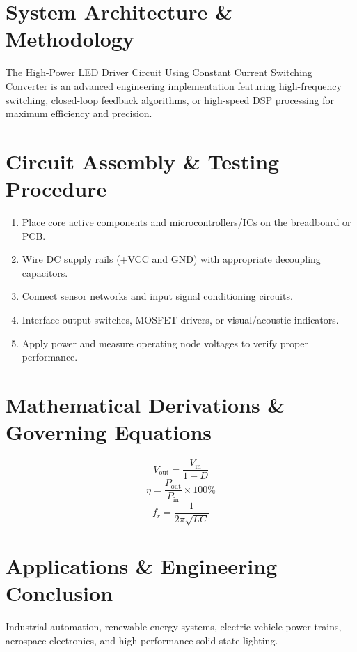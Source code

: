 \documentclass[11pt,a4paper]{article}
\begin{document}
\section{System Architecture \& Methodology}
The High-Power LED Driver Circuit Using Constant Current Switching Converter is an advanced engineering implementation featuring high-frequency switching, closed-loop feedback algorithms, or high-speed DSP processing for maximum efficiency and precision.

\section{Circuit Assembly \& Testing Procedure}
\begin{enumerate}
    \item Place core active components and microcontrollers/ICs on the breadboard or PCB.
    \item Wire DC supply rails (+VCC and GND) with appropriate decoupling capacitors.
    \item Connect sensor networks and input signal conditioning circuits.
    \item Interface output switches, MOSFET drivers, or visual/acoustic indicators.
    \item Apply power and measure operating node voltages to verify proper performance.
\end{enumerate}

\section{Mathematical Derivations \& Governing Equations}
\begin{equation}
V_{\text{out}} = \frac{V_{\text{in}}}{1 - D}
\end{equation}
\begin{equation}
\eta = \frac{P_{\text{out}}}{P_{\text{in}}} \times 100\%
\end{equation}
\begin{equation}
f_r = \frac{1}{2\pi \sqrt{L C}}
\end{equation}

\section{Applications \& Engineering Conclusion}
Industrial automation, renewable energy systems, electric vehicle power trains, aerospace electronics, and high-performance solid state lighting.
\end{document}
